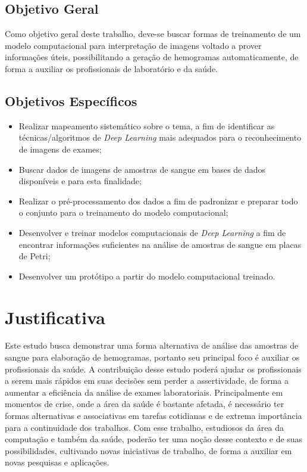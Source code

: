 \subsection{Objetivo Geral}
Como objetivo geral deste trabalho, deve-se buscar formas de treinamento de um modelo computacional para interpretação de imagens voltado a prover informações úteis, possibilitando a geração de hemogramas automaticamente, de forma a auxiliar os profissionais de laboratório e da saúde.

\subsection{Objetivos Específicos}
\begin{itemize}
	\item Realizar mapeamento sistemático sobre o tema, a fim de identificar as técnicas/algoritmos de \emph{Deep Learning} mais adequados para o reconhecimento de imagens de exames;
	\item Buscar dados de imagens de amostras de sangue em bases de dados disponíveis e para esta finalidade;
	\item Realizar o pré-processamento dos dados a fim de padronizar e preparar todo o conjunto para o treinamento do modelo computacional;
	\item Desenvolver e treinar modelos computacionais de \emph{Deep Learning} a fim de encontrar informações suficientes na análise de amostras de sangue em placas de Petri;
	\item Desenvolver um protótipo a partir do modelo computacional treinado.
\end{itemize}

\section{Justificativa}
\label{sec:justificativa}
Este estudo busca demonstrar uma forma alternativa de análise das amostras de sangue para elaboração de hemogramas, portanto seu principal foco é auxiliar os profissionais da saúde. A contribuição desse estudo poderá ajudar os profissionais a serem mais rápidos em suas decisões sem perder a assertividade, de forma a aumentar a eficiência da análise de exames laboratoriais. Principalmente em momentos de crise, onde a área da saúde é bastante afetada, é necessário ter formas alternativas e associativas em tarefas cotidianas e de extrema importância para a continuidade dos trabalhos. Com esse trabalho, estudiosos da área da computação e também da saúde, poderão ter uma noção desse contexto e de suas possibilidades, cultivando novas iniciativas de trabalho, de forma a auxiliar em novas pesquisas e aplicações.

